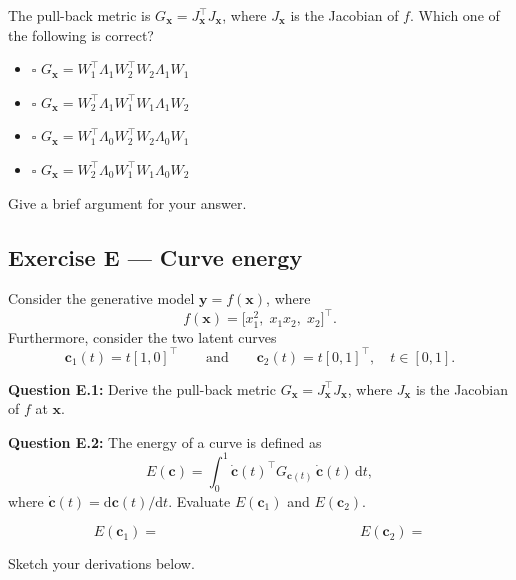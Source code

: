 \documentclass[12pt,a4paper]{article}
\begin{document}
The pull-back metric is $G_{\mathbf{x}} = J_{\mathbf{x}}^\top J_{\mathbf{x}}$, where $J_{\mathbf{x}}$
is the Jacobian of $f$.  Which one of the following is correct?

\begin{itemize}[noitemsep,label={}]
  \item[\textbf{A}] $\square$ \quad $G_{\mathbf{x}} = W_1^\top \Lambda_1 W_2^\top W_2 \Lambda_1 W_1$
  \item[\textbf{B}] $\square$ \quad $G_{\mathbf{x}} = W_2^\top \Lambda_1 W_1^\top W_1 \Lambda_1 W_2$
  \item[\textbf{C}] $\square$ \quad $G_{\mathbf{x}} = W_1^\top \Lambda_0 W_2^\top W_2 \Lambda_0 W_1$
  \item[\textbf{D}] $\square$ \quad $G_{\mathbf{x}} = W_2^\top \Lambda_0 W_1^\top W_1 \Lambda_0 W_2$
\end{itemize}

Give a brief argument for your answer.

\vspace{5cm}

\newpage
\subsection*{Exercise E --- Curve energy}

Consider the generative model $\mathbf{y}=f(\mathbf{x})$, where
\[
  f(\mathbf{x}) = \bigl[x_1^2,\; x_1 x_2,\; x_2\bigr]^\top. \tag{10}
\]
Furthermore, consider the two latent curves
\[
  \mathbf{c}_1(t) = t[1,0]^\top \qquad\text{and}\qquad \mathbf{c}_2(t) = t[0,1]^\top, \quad t\in[0,1].
\]

\textbf{Question E.1:} Derive the pull-back metric
$G_{\mathbf{x}} = J_{\mathbf{x}}^\top J_{\mathbf{x}}$, where $J_{\mathbf{x}}$ is the Jacobian of
$f$ at $\mathbf{x}$.

\vspace{5cm}

\textbf{Question E.2:} The energy of a curve is defined as
\[
  E(\mathbf{c}) = \int_0^1 \dot{\mathbf{c}}(t)^\top G_{\mathbf{c}(t)}\,\dot{\mathbf{c}}(t)\,\mathrm{d}t, \tag{11}
\]
where $\dot{\mathbf{c}}(t)=\mathrm{d}\mathbf{c}(t)/\mathrm{d}t$.  Evaluate $E(\mathbf{c}_1)$ and
$E(\mathbf{c}_2)$.

\[
  E(\mathbf{c}_1) = \hspace{6cm} E(\mathbf{c}_2) =
\]

Sketch your derivations below.

\vspace{5cm}
\end{document}

